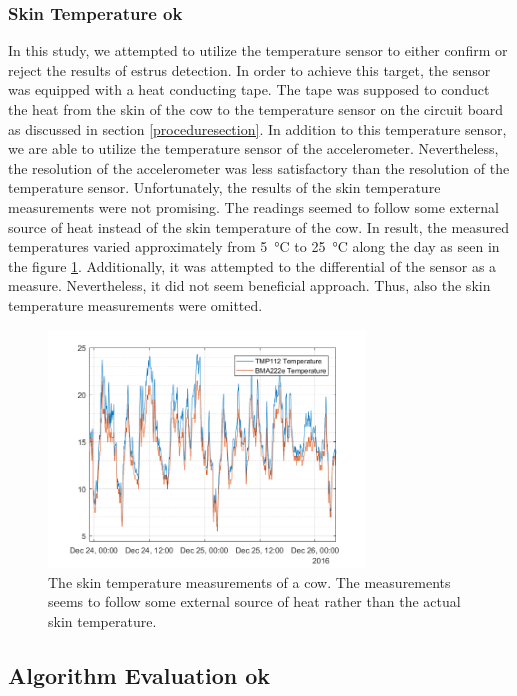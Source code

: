 \documentclass[english,12pt,a4paper,pdftex,elec,utf8]{aaltothesis}
\begin{document}
\subsubsection{Skin Temperature ok}

In this study, we attempted to utilize the temperature sensor to either confirm or reject the results of estrus detection. In order to achieve this target, the sensor was equipped with a heat conducting tape. The tape was supposed to conduct the heat from the skin of the cow to the temperature sensor on the circuit board as discussed in section \ref{proceduresection}. In addition to this temperature sensor, we are able to utilize the temperature sensor of the accelerometer. Nevertheless, the resolution of the accelerometer was less satisfactory than the resolution of the temperature sensor. Unfortunately, the results of the skin temperature measurements were not promising. The readings seemed to follow some external source of heat instead of the skin temperature of the cow. In result, the measured temperatures varied approximately from \SI{5}{\celsius} to \SI{25}{\celsius} along the day as seen in the figure \ref{temperaturemeasurements}. Additionally, it was attempted to the differential of the sensor as a measure. Nevertheless, it did not seem beneficial approach. Thus, also the skin temperature measurements were omitted. 

\begin{figure}[h]
\centering
\includegraphics[width = 0.75\textwidth]{figures/lehma9885temperature.png}
\caption{The skin temperature measurements of a cow. The measurements seems to follow some external source of heat rather than the actual skin temperature.}
\label{temperaturemeasurements}
\end{figure}


\subsection{Algorithm Evaluation ok} \label{algorithmevaluationsection}
\end{document}
